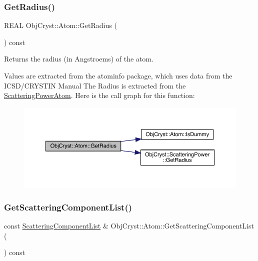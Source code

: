 \subsubsection{\texorpdfstring{GetRadius()}{GetRadius()}}
{\footnotesize\ttfamily R\+E\+AL Obj\+Cryst\+::\+Atom\+::\+Get\+Radius (\begin{DoxyParamCaption}{ }\end{DoxyParamCaption}) const}



Returns the radius (in Angstroems) of the atom. 

Values are extracted from the \textquotesingle{}atominfo\textquotesingle{} package, which uses data from the I\+C\+S\+D/\+C\+R\+Y\+S\+T\+IN Manual The Radius is extracted from the \mbox{\hyperlink{class_obj_cryst_1_1_scattering_power_atom}{Scattering\+Power\+Atom}}. Here is the call graph for this function\+:
\nopagebreak
\begin{figure}[H]
\begin{center}
\leavevmode
\includegraphics[width=350pt]{class_obj_cryst_1_1_atom_a5a985d3220fb8754f0db01ecde408bb9_cgraph}
\end{center}
\end{figure}
\mbox{\label{class_obj_cryst_1_1_atom_a91b7898458e7d14431ceaa380b8a2121}} 
\subsubsection{\texorpdfstring{GetScatteringComponentList()}{GetScatteringComponentList()}}
{\footnotesize\ttfamily const \mbox{\hyperlink{class_obj_cryst_1_1_scattering_component_list}{Scattering\+Component\+List}} \& Obj\+Cryst\+::\+Atom\+::\+Get\+Scattering\+Component\+List (\begin{DoxyParamCaption}{ }\end{DoxyParamCaption}) const\hspace{0.3cm}{\ttfamily [virtual]}}




